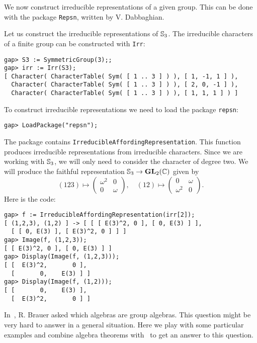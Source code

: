 We now construct irreducible representations of a given group. 
This can be done with the package \lstinline{Repsn}, 
written by V.  Dabbaghian. 

\begin{example}
Let us construct the irreducible representations of $\mathbb{S}_3$. 
The irreducible characters of a finite group
can be constructed with \lstinline{Irr}:
\begin{lstlisting}
gap> S3 := SymmetricGroup(3);;
gap> irr := Irr(S3);
[ Character( CharacterTable( Sym( [ 1 .. 3 ] ) ), [ 1, -1, 1 ] ), 
  Character( CharacterTable( Sym( [ 1 .. 3 ] ) ), [ 2, 0, -1 ] ), 
  Character( CharacterTable( Sym( [ 1 .. 3 ] ) ), [ 1, 1, 1 ] ) ]
\end{lstlisting}
To construct irreducible representations we need to load the package
\lstinline{repsn}:
\begin{lstlisting}
gap> LoadPackage("repsn");
\end{lstlisting}

The package contains \lstinline{IrreducibleAffordingRepresentation}. This function produces 
irreducible representations from irreducible characters. Since we are working with $\mathbb{S}_3$, we will only need
to consider the character of degree two. We will produce 
the faithful representation $\mathbb{S}_3\to\mathbf{GL}_2(\mathbb{C})$ given by 
\[
	(123)\mapsto\begin{pmatrix}
		\omega^2 & 0\\
		0 & \omega
	\end{pmatrix},
	\quad
	(12)\mapsto\begin{pmatrix}
		0 & \omega \\
		\omega^2 & 0
	\end{pmatrix}.
\]
Here is the code:
\begin{lstlisting}
gap> f := IrreducibleAffordingRepresentation(irr[2]);
[ (1,2,3), (1,2) ] -> [ [ [ E(3)^2, 0 ], [ 0, E(3) ] ], 
  [ [ 0, E(3) ], [ E(3)^2, 0 ] ] ]
gap> Image(f, (1,2,3));
[ [ E(3)^2, 0 ], [ 0, E(3) ] ]
gap> Display(Image(f, (1,2,3)));
[ [  E(3)^2,       0 ],
  [       0,    E(3) ] ]
gap> Display(Image(f, (1,2)));
[ [       0,    E(3) ],
  [  E(3)^2,       0 ] ]
\end{lstlisting}
\end{example}


In~\cite[Problem 1]{MR0178056}, R. Brauer asked which algebras are group
algebras. This question might be very hard to answer in a general situation.
Here we play with some particular examples and combine algebra theorems with \GAP~to get an answer to this question.

